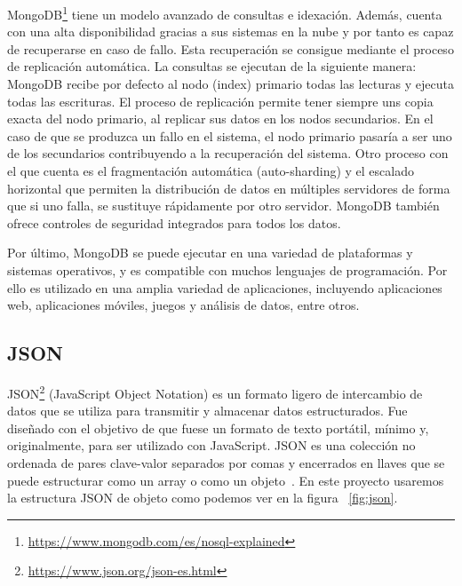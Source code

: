\documentclass[a4paper, 12pt]{book}
\begin{document}
MongoDB\footnote{\url{https://www.mongodb.com/es/nosql-explained}} tiene un modelo avanzado de consultas e idexación.               
Además, cuenta con una alta disponibilidad gracias a sus sistemas en la nube y por tanto es capaz de recuperarse en caso de fallo. 
Esta recuperación se consigue mediante el proceso de replicación automática.
La consultas se ejecutan de la siguiente manera: MongoDB recibe por defecto al nodo (index) primario todas las lecturas y ejecuta todas las escrituras.
El proceso de replicación permite tener siempre uns copia exacta del nodo primario, al replicar sus datos en los nodos secundarios.
En el caso de que se produzca un fallo en el sistema, el nodo primario pasaría a ser uno de los secundarios contribuyendo a la recuperación del sistema. 
Otro proceso con el que cuenta es el fragmentación automática (auto-sharding) y el escalado horizontal que permiten la distribución de datos en múltiples servidores de forma que si uno falla, se sustituye rápidamente por otro servidor.
MongoDB también ofrece controles de seguridad integrados para todos los datos.


Por último, MongoDB se puede ejecutar en una variedad de plataformas y sistemas operativos, y es compatible con muchos lenguajes de programación.
Por ello es utilizado en una amplia variedad de aplicaciones, incluyendo aplicaciones web, aplicaciones móviles, juegos y análisis de datos, entre otros.


\subsection{JSON} %
\label{sec:json} %

JSON\footnote{\url{https://www.json.org/json-es.html}} (JavaScript Object Notation) es un formato ligero de intercambio de datos que se utiliza para transmitir y almacenar datos estructurados. 
Fue diseñado con el objetivo de que fuese un formato de texto portátil, mínimo y, originalmente, para ser utilizado con JavaScript. 
JSON es una colección no ordenada de pares clave-valor separados por comas y encerrados en llaves que se puede estructurar como un array o como un objeto~\cite{bray2014javascript}. 
En este proyecto usaremos la estructura JSON de objeto como podemos ver en la figura ~\ref{fig:json}. 
\end{document}
